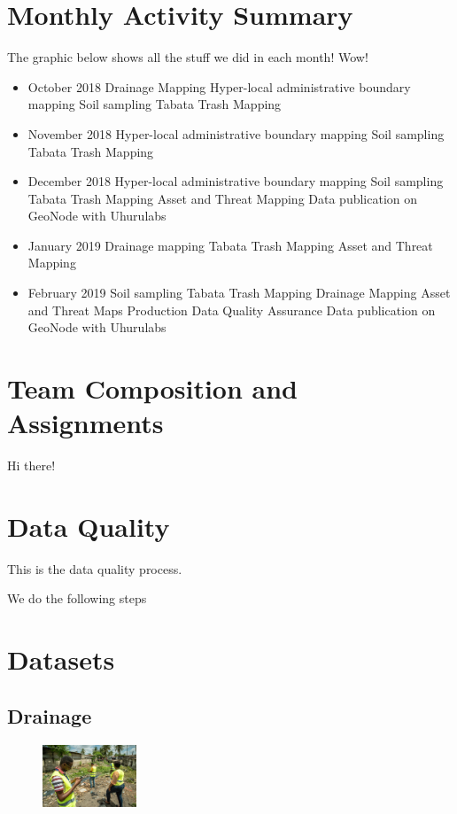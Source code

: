 \documentclass[a4paper,12pt,twoside]{article}
\begin{document}
\begin{multicols}{2}

  \lipsum[5-8]
  
\end{multicols}

\newpage
\section{Monthly Activity Summary}

The graphic below shows all the stuff we did in each month! Wow!

\bigskip

\begin{itemize}
    \item October 2018
Drainage Mapping
Hyper-local administrative boundary mapping
Soil sampling
Tabata Trash Mapping
    \item November 2018
Hyper-local administrative boundary mapping
Soil sampling
Tabata Trash Mapping
    \item December 2018
Hyper-local administrative boundary mapping
Soil sampling
Tabata Trash Mapping
Asset and Threat Mapping
Data publication on GeoNode with Uhurulabs
    \item January 2019
Drainage mapping
Tabata Trash Mapping
Asset and Threat Mapping
    \item February 2019
Soil sampling
Tabata Trash Mapping
Drainage Mapping
Asset and Threat Maps Production
Data Quality Assurance
Data publication on GeoNode with Uhurulabs
\end{itemize}

\section{Team Composition and Assignments}
Hi there!

\section{Data Quality}
This is the data quality process. 

We do the following steps


\section{Datasets}

\subsection{Drainage}
\begin{figure} %
    \centering
    \includegraphics[width=0.25\textwidth]{images/Drainage_Mapping.jpg}
\end{figure}
\end{document}
